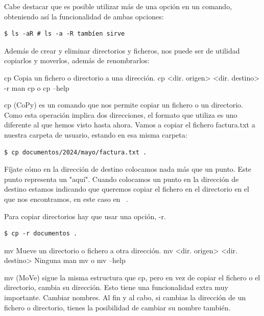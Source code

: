 Cabe destacar que es posible utilizar más de una opción en un comando, obteniendo así la funcionalidad de ambas opciones:

\begin{tcolorbox-code}
\begin{lstlisting}
$ ls -aR # ls -a -R tambíen sirve
\end{lstlisting}
\end{tcolorbox-code}

Además de crear y eliminar directorios y ficheros, nos puede ser de utilidad copiarlos y moverlos, además de renombrarlos:

\begin{command-info}
{cp}
{Copia un fichero o directorio a una dirección.}
{cp <dir. origen> <dir. destino>}
{-r}
{man cp o cp --help}
\end{command-info}

cp (CoPy) es un comando que nos permite copiar un fichero o un directorio. Como esta operación implica dos direcciones, el formato que utiliza es uno diferente al que hemos visto hasta ahora. Vamos a copiar el fichero factura.txt a nuestra carpeta de usuario, estando en esa misma carpeta:

\begin{tcolorbox-code}
\begin{lstlisting}
$ cp documentos/2024/mayo/factura.txt .
\end{lstlisting}
\end{tcolorbox-code}

Fíjate cómo en la dirección de destino colocamos nada más que un punto. Este punto representa un "aquí". Cuando colocamos un punto en la dirección de destino estamos indicando que queremos copiar el fichero en el directorio en el que nos encontramos, en este caso en ~.

Para copiar directorios hay que usar una opción, -r.

\begin{tcolorbox-code}
\begin{lstlisting}
$ cp -r documentos .
\end{lstlisting}
\end{tcolorbox-code}

\begin{command-info}
{mv}
{Mueve un directorio o fichero a otra dirección.}
{mv <dir. origen> <dir. destino>}
{Ninguna}
{man mv o mv --help}
\end{command-info}

mv (MoVe) sigue la misma estructura que cp, pero en vez de copiar el fichero o el directorio, cambia su dirección. Esto tiene una funcionalidad extra muy importante. Cambiar nombres. Al fin y al cabo, si cambias la dirección de un fichero o directorio, tienes la posibilidad de cambiar su nombre también.

